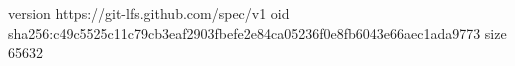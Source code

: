 version https://git-lfs.github.com/spec/v1
oid sha256:c49c5525c11c79cb3eaf2903fbefe2e84ca05236f0e8fb6043e66aec1ada9773
size 65632
